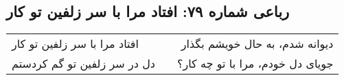 \begin{center}
\section*{رباعی شماره ۷۹: افتاد مرا با سر زلفین تو کار}
\label{sec:079}
\begin{longtable}{l p{0.5cm} r}
افتاد مرا با سر زلفین تو کار
&&
دیوانه شدم، به حال خویشم بگذار
\\
دل در سر زلفین تو گم کردستم
&&
جویای دل خودم، مرا با تو چه کار؟
\\
\end{longtable}
\end{center}
